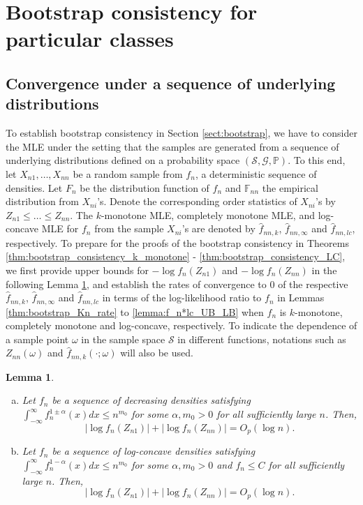 \documentclass[12pt,letterpaper, twoside, openany]{article}
\theoremstyle{plain}
\newtheorem{lemma}[theorem]{Lemma}
\begin{document}
\section{Bootstrap consistency for particular classes}
\subsection{Convergence under a sequence of underlying distributions}\label{sect:bootstrap_general}
To establish bootstrap consistency in Section \ref{sect:bootstrap}, we have to consider the MLE under the setting that the samples are generated from a sequence of underlying distributions defined on a probability space $(\mathcal{S}, \mathcal{G}, \mathbb{P})$. To this end, let $X_{n1},\ldots,X_{nn}$ be a random sample from $f_n$, a deterministic sequence of densities. Let $F_n$ be the distribution function of $f_n$ and $\mathbb{F}_{nn}$ the empirical distribution from $X_{ni}$'s. Denote the corresponding order statistics of $X_{ni}$'s by $Z_{n1} \leq  \ldots \leq  Z_{nn}$. The $k$-monotone MLE, completely monotone MLE, and log-concave MLE for $f_n$ from the sample $X_{ni}$'s are denoted by $\hat{f}_{nn,k}$, $\hat{f}_{nn, \infty}$ and $\hat{f}_{nn,lc}$, respectively. 
To prepare for the proofs of the bootstrap consistency in Theorems \ref{thm:bootstrap_consistency_k_monotone} - \ref{thm:bootstrap_consistency_LC}, we first provide upper bounds for $-\log f_n(Z_{n1})$ and $-\log f_n(Z_{nn})$ in the following Lemma \ref{lemma:fn_unimodal_logf_bound}, and establish the rates of convergence to $0$ of the respective $\hat{f}_{nn,k}$, $\hat{f}_{nn, \infty}$ and $\hat{f}_{nn,lc}$ in terms of the log-likelihood ratio to $f_n$ in Lemmas \ref{thm:bootstrap_Kn_rate} to \ref{lemma:f_n*lc_UB_LB} when $f_n$ is $k$-monotone, completely monotone and log-concave, respectively. 
To indicate the dependence of a sample point $\omega$ in the sample space $\mathcal{S}$ in different functions, notations such as $Z_{nn}(\omega)$ and $\hat{f}_{nn,k}(\cdot;\omega)$ will also be used.



\begin{lemma}\label{lemma:fn_unimodal_logf_bound}
    \begin{enumerate}[(a)]
        \item 
        Let $f_n$ be a sequence of decreasing densities satisfying $\int^\infty_{-\infty} f^{1\pm \alpha}_n(x)dx \leq n^{m_0}$ for some $\alpha, m_0 > 0$ for all sufficiently large $n$. Then, 
        \begin{equation*}
            |\log f_n(Z_{n1})| + |\log f_n(Z_{nn})| = O_p(\log n).
        \end{equation*}
        \item 
        Let $f_n$ be a sequence of log-concave densities satisfying $\int^\infty_{-\infty} f^{1- \alpha}_n(x)dx \leq n^{m_0}$ for some $\alpha, m_0 > 0$  and $f_n \leq C$ for all sufficiently large $n$. Then, 
        \begin{equation*}
            |\log f_n(Z_{n1})| + |\log f_n(Z_{nn})| = O_p(\log n).
        \end{equation*}
    \end{enumerate}    
\end{lemma}
\end{document}
